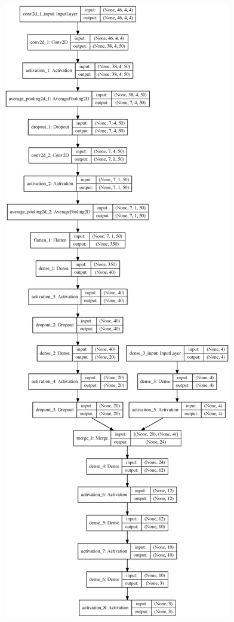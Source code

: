 \begin{figure}
  \includegraphics{Figures/Chapter5/SN}
  \caption{}
  \label{fig:SNClassificationNetwork}
\end{figure}


